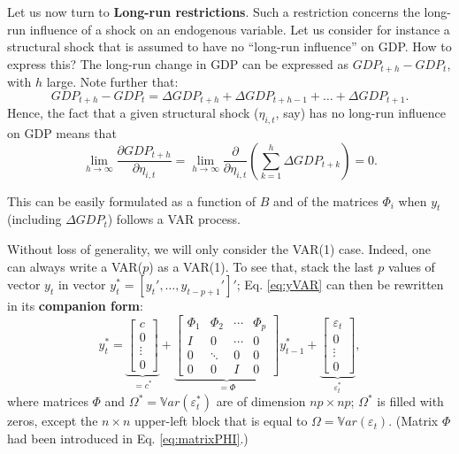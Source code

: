 \documentclass[
  12pt,
]{book}
\theoremstyle{definition}
\theoremstyle{definition}
\theoremstyle{definition}
\theoremstyle{definition}
\theoremstyle{remark}
\begin{document}
Let us now turn to \textbf{Long-run restrictions}. Such a restriction concerns the long-run influence of a shock on an endogenous variable. Let us consider for instance a structural shock that is assumed to have no ``long-run influence'' on GDP. How to express this? The long-run change in GDP can be expressed as \(GDP_{t+h} - GDP_t\), with \(h\) large. Note further that:
\[
GDP_{t+h} - GDP_t = \Delta GDP_{t+h} +\Delta GDP_{t+h-1} + \dots + \Delta GDP_{t+1}.
\]
Hence, the fact that a given structural shock (\(\eta_{i,t}\), say) has no long-run influence on GDP means that
\[
\lim_{h\rightarrow\infty}\frac{\partial GDP_{t+h}}{\partial \eta_{i,t}} = \lim_{h\rightarrow\infty} \frac{\partial}{\partial \eta_{i,t}}\left(\sum_{k=1}^h \Delta  GDP_{t+k}\right)= 0.
\]

This can be easily formulated as a function of \(B\) and of the matrices \(\Phi_i\) when \(y_t\) (including \(\Delta GDP_t\)) follows a VAR process.

Without loss of generality, we will only consider the VAR(1) case. Indeed, one can always write a VAR(\(p\)) as a VAR(1). To see that, stack the last \(p\) values of vector \(y_t\) in vector \(y_{t}^{*}=[y_t',\dots,y_{t-p+1}']'\); Eq. \eqref{eq:yVAR} can then be rewritten in its \textbf{companion form}:
\begin{equation}
y_{t}^{*} =
\underbrace{\left[\begin{array}{c}
c\\
0\\
\vdots\\
0\end{array}\right]}_{=c^*}+
\underbrace{\left[\begin{array}{cccc}
\Phi_{1} & \Phi_{2} & \cdots & \Phi_{p}\\
I & 0 & \cdots & 0\\
0 & \ddots & 0 & 0\\
0 & 0 & I & 0\end{array}\right]}_{=\Phi}
y_{t-1}^{*}+
\underbrace{\left[\begin{array}{c}
\varepsilon_{t}\\
0\\
\vdots\\
0\end{array}\right]}_{\varepsilon_t^*},\label{eq:ystarVAR}
\end{equation}
where matrices \(\Phi\) and \(\Omega^* = \mathbb{V}ar(\varepsilon_t^*)\) are of dimension \(np \times np\); \(\Omega^*\) is filled with zeros, except the \(n\times n\) upper-left block that is equal to \(\Omega = \mathbb{V}ar(\varepsilon_t)\). (Matrix \(\Phi\) had been introduced in Eq. \eqref{eq:matrixPHI}.)
\end{document}
